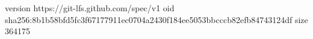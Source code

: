 version https://git-lfs.github.com/spec/v1
oid sha256:8b1b58bfd5fc3f67177911ec0704a2430f184ee5053bbcccb82efb84743124df
size 364175
